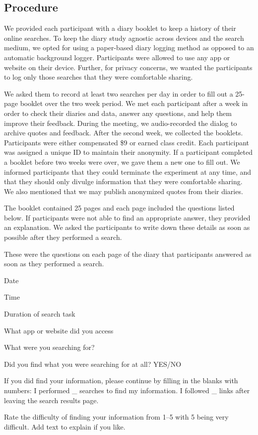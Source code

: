 \subsection{Procedure}
We provided each participant with a diary booklet to keep a history of their online searches. To keep the diary study agnostic across devices and the search medium, we opted for using a paper-based diary logging method as opposed to an automatic background logger. Participants were allowed to use any app or website on their device. Further, for privacy concerns, we wanted the participants to log only those searches that they were comfortable sharing. 

We asked them to record at least two searches per day in order to fill out a 25-page booklet over the two week period. We met each participant after a week in order to check their diaries and data, answer any questions, and help them improve their feedback. During the meeting, we audio-recorded the dialog to archive quotes and feedback. After the second week, we collected the booklets. Participants were either compensated \$9 or earned class credit. Each participant was assigned a unique ID to maintain their anonymity. If a participant completed a booklet before two weeks were over, we gave them a new one to fill out. We informed participants that they could terminate the experiment at any time, and that they should only divulge information that they were comfortable sharing. We also mentioned that we may publish anonymized quotes from their diaries. 

The booklet contained 25 pages and each page included the questions listed below. If participants were not able to find an appropriate answer, they provided an explanation. We asked the participants to write down these details as soon as possible after they performed a search. 

These were the questions on each page of the diary that participants answered as soon as they performed a search.
\begin{tight_enumerate}
            \item Date
            \item Time
            \item Duration of search task 
            \item What app or website did you access
            \item What were you searching for?
            \item Did you find what you were searching for at all? YES/NO
            \item If you did find your information, please continue by filling in the blanks with numbers: I performed \_ searches to find my information. I followed \_ links after leaving the search results page.
            \item Rate the difficulty of finding your information from 1--5 with 5 being very difficult. Add text to explain if you like.
\end{tight_enumerate}


